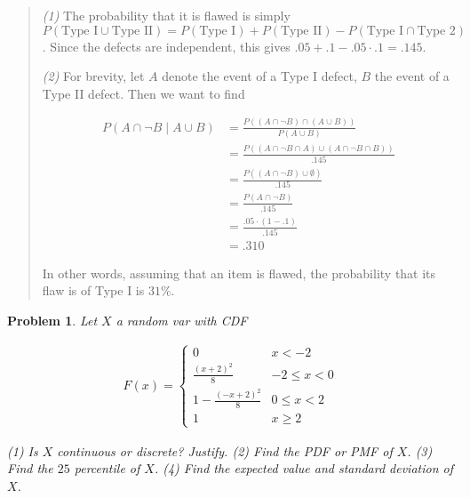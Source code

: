 \documentclass[a4paper, 12pt]{article}
\newtheorem{problem}{Problem}
\newtheorem{problem}{Problem}
\begin{document}
\small
\begin{quote}

\textit{(1)} The probability that it is flawed is simply $P(\text{Type I} \cup
\text{Type II}) = P(\text{Type I}) +
P(\text{Type II}) - P(\text{Type I} \cap  \text{Type 2})$. Since the defects are
independent, this gives $.05 + .1 - .05 \cdot .1 = .145 $.

\textit{(2)} For brevity, let $A$ denote the event of a Type I defect, $B$ the
event of a Type II defect. Then we want to find 

\begin{align*}
    P( A \cap \neg B \mid A \cup B ) &= \frac{P\left( \left( A \cap \neg B
    \right) \cap \left( A \cup B \right)   \right) }{P(A \cup B)} \\ 
                                     &= \frac{P\left( (A \cap \neg B \cap A)
                                     \cup (A \cap  \neg B \cap B)  \right)
                                 }{.145} \\ 
                                 &= \frac{P\left( \left( A \cap \neg B \right)
                                 \cup \emptyset  \right) }{.145} \\ 
                                 &= \frac{P\left( A \cap \neg B \right) }{.145}
                                 \\ 
                                 &= \frac{.05 \cdot (1 - .1)}{.145} \\ 
                                 &=.310
\end{align*}

In other words, assuming that an item is flawed, the probability that its flaw
is of Type I is $31\%$.

\end{quote}
\normalsize

\pagebreak

\begin{problem}
    Let $X$ a random var with CDF 

    \begin{align*}
        F(x) = \begin{cases}
            0 & x < -2 \\ 
            \frac{( x+2 )^2}{8} & -2 \leq x < 0 \\ 
            1 - \frac{(-x+2)^2}{8} & 0 \leq x < 2 \\ 
            1 & x \geq 2
        \end{cases}
    \end{align*}

    \textit{(1)} Is $X$ continuous or discrete? Justify. \textit{(2)} Find the
    PDF or PMF of $X$. \textit{(3)} Find the $25$ percentile of $X$.
    \textit{(4)} Find the expected value and standard deviation of $X$.
\end{problem}
\end{document}

